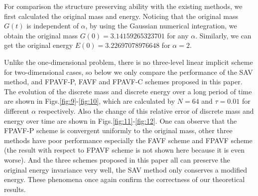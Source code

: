 \documentclass[preprint,compress,3p,10pt,fleqn]{elsarticle}
\numberwithin{equation}{section}
\begin{document}
For comparison the structure preserving ability with the existing methods, we first calculated the original mass and energy.
Noticing that the original mass $G(t)$ is independent of $\alpha$, by using the Gaussian numerical integration, we obtain the original mass $G(0)=3.14159265323701$ for any $\alpha$. Similarly, we can get the original energy $E(0)=3.22697078976648$ for $\alpha=2$.

Unlike the one-dimensional problem, there is no three-level linear implicit scheme for two-dimensional cases, so below we only compare the performance of the SAV method, and FPAVF-P, FAVF and FPAVF-C schemes proposed in this paper. The evolution of the discrete mass and discrete energy over a long period of time are shown in Figs.\ref{fig:9}-\ref{fig:10}, which are calculated by $N=64$ and $\tau=0.01$ for different $\alpha$ respectively.
Also the change of this relative error of discrete mass and energy over time are shown in Figs.\ref{fig:11}-\ref{fig:12}.
One can observe that the FPAVF-P scheme is convergent uniformly to the original mass, other three methods have poor performance especially the FAVF scheme and FPAVF scheme (the result with respect to FPAVF scheme is not shown here because it is even worse).
And the three schemes proposed in this paper all can preserve the original energy invariance very well, the SAV method only conserves a modified energy.
These phenomena once again confirm the correctness of our theoretical results.
\end{document}
